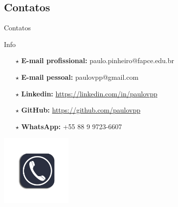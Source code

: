 \documentclass{beamer}
\begin{document}
\subsection{Contatos}
%
\begin{frame}{Contatos}
    \vspace{0.5cm}
    \begin{block}{Info}
        \begin{itemize}
            \item [$\star$] \textbf{E-mail profissional:} paulo.pinheiro@fapce.edu.br\\
            \item [$\star$] \textbf{E-mail pessoal:} paulovpp@gmail.com\\
            \item [$\star$] \textbf{Linkedin:} \url{https://linkedin.com/in/paulovpp}\\
            \item [$\star$] \textbf{GitHub:} \url{https://github.com/paulovpp}\\
            \item [$\star$] \textbf{WhatsApp:} +55 88 9 9723-6607
        \end{itemize}
    \end{block}
    \centering
    \includegraphics[height=3.5cm]{contato.png}
    \vspace{0.5cm}
\end{frame}



\end{document}
